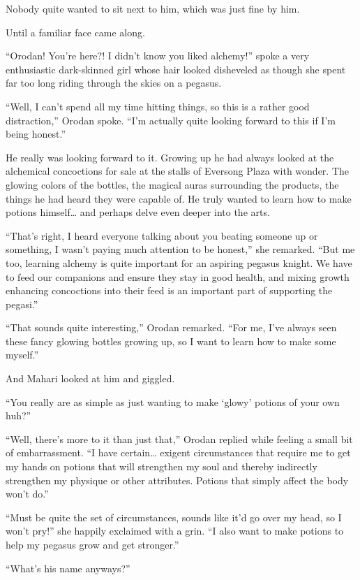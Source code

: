 \documentclass[a4paper,10pt]{book}
\begin{document}
Nobody quite wanted to sit next to him, which was just fine by him.\par
Until a familiar face came along.\par
“Orodan! You’re here?! I didn’t know you liked alchemy!” spoke a very enthusiastic dark-skinned girl whose hair looked disheveled as though she spent far too long riding through the skies on a pegasus.\par
“Well, I can’t spend all my time hitting things, so this is a rather good distraction,” Orodan spoke. “I’m actually quite looking forward to this if I’m being honest.”\par
He really was looking forward to it. Growing up he had always looked at the alchemical concoctions for sale at the stalls of Eversong Plaza with wonder. The glowing colors of the bottles, the magical auras surrounding the products, the things he had heard they were capable of. He truly wanted to learn how to make potions himself… and perhaps delve even deeper into the arts.\par
“That’s right, I heard everyone talking about you beating someone up or something, I wasn’t paying much attention to be honest,” she remarked. “But me too, learning alchemy is quite important for an aspiring pegasus knight. We have to feed our companions and ensure they stay in good health, and mixing growth enhancing concoctions into their feed is an important part of supporting the pegasi.”\par
“That sounds quite interesting,” Orodan remarked. “For me, I’ve always seen these fancy glowing bottles growing up, so I want to learn how to make some myself.”\par
And Mahari looked at him and giggled.\par
“You really are as simple as just wanting to make ‘glowy’ potions of your own huh?”\par
“Well, there’s more to it than just that,” Orodan replied while feeling a small bit of embarrassment. “I have certain… exigent circumstances that require me to get my hands on potions that will strengthen my soul and thereby indirectly strengthen my physique or other attributes. Potions that simply affect the body won’t do.”\par
“Must be quite the set of circumstances, sounds like it’d go over my head, so I won’t pry!” she happily exclaimed with a grin. “I also want to make potions to help my pegasus grow and get stronger.”\par
“What’s his name anyways?”\par
\end{document}

